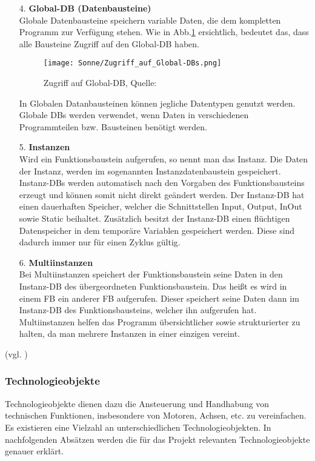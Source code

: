 \begin{itemize}
        \item[4.] \textbf{Global-DB (Datenbausteine)} \\
            Globale Datenbausteine speichern variable Daten, die dem kompletten Programm zur Verfügung stehen. Wie in Abb.\ref{Zugriff auf Global-DB} ersichtlich, bedeutet das, dass alle Bausteine Zugriff auf den Global-DB haben.

            \begin{figure}[h]
                \centering
                \texttt{[image: Sonne/Zugriff\_auf\_Global-DBs.png]}
                \caption{Zugriff auf Global-DB, Quelle: \cite{Programmierleitfaden_für_S7-1500}}
                \label{Zugriff auf Global-DB}
            \end{figure}

            In Globalen Datanbausteinen können jegliche Datentypen genutzt werden.\\
            Globale DBs werden verwendet, wenn Daten in verschiedenen Programmteilen bzw. Bausteinen benötigt werden.

        \item[5.] \textbf{Instanzen} \\
            Wird ein Funktionsbaustein aufgerufen, so nennt man das Instanz. Die Daten der Instanz, werden im sogenannten Instanzdatenbaustein gespeichert. Instanz-DBs werden automatisch nach den Vorgaben des Funktionsbausteins erzeugt und können somit nicht direkt geändert werden. Der Instanz-DB hat einen dauerhaften Speicher, welcher die Schnittstellen Input, Output, InOut sowie Static beihaltet. Zusätzlich besitzt der Instanz-DB einen flüchtigen Datenspeicher in dem temporäre Variablen gespeichert werden. Diese sind dadurch immer nur für einen Zyklus gültig.
            
        \item[6.] \textbf{Multiinstanzen} \\
            Bei Multiinstanzen speichert der Funktionsbaustein seine Daten in den Instanz-DB des übergeordneten Funktionsbaustein. Das heißt es wird in einem FB ein anderer FB aufgerufen. Dieser speichert seine Daten dann im Instanz-DB des Funktionsbausteins, welcher ihn aufgerufen hat. Multiinstanzen helfen das Programm übersichtlicher sowie strukturierter zu halten, da man mehrere Instanzen in einer einzigen vereint.
            

    \end{itemize}
    (vgl. \cite{Programmierleitfaden_für_S7-1500})

    \subsubsection[Technologieobjekte]{Technologieobjekte}
    Technologieobjekte dienen dazu die Ansteuerung und Handhabung von technischen Funktionen, insbesondere von Motoren, Achsen, etc. zu vereinfachen. Es existieren eine Vielzahl an unterschiedlichen Technologieobjekten. In nachfolgenden Absätzen werden die für das Projekt relevanten Technologieobjekte genauer erklärt.

